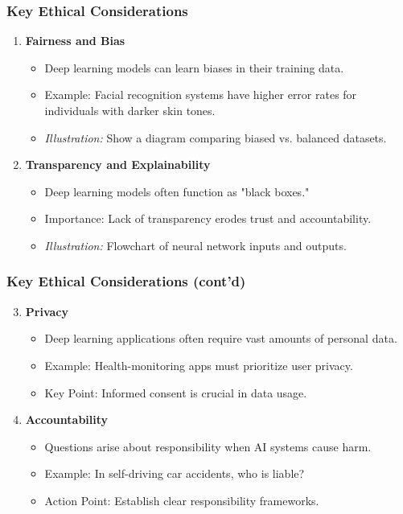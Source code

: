 \documentclass[aspectratio=169]{beamer}
\begin{document}
\begin{frame}[fragile]
    \frametitle{Key Ethical Considerations}
    \begin{enumerate}
        \item \textbf{Fairness and Bias}
        \begin{itemize}
            \item Deep learning models can learn biases in their training data.
            \item Example: Facial recognition systems have higher error rates for individuals with darker skin tones.
            \item \textit{Illustration:} Show a diagram comparing biased vs. balanced datasets.
        \end{itemize}
        
        \item \textbf{Transparency and Explainability}
        \begin{itemize}
            \item Deep learning models often function as "black boxes."
            \item Importance: Lack of transparency erodes trust and accountability.
            \item \textit{Illustration:} Flowchart of neural network inputs and outputs.
        \end{itemize}
    \end{enumerate}
\end{frame}

\begin{frame}[fragile]
    \frametitle{Key Ethical Considerations (cont'd)}
    \begin{enumerate}\setcounter{enumi}{2}
        \item \textbf{Privacy}
        \begin{itemize}
            \item Deep learning applications often require vast amounts of personal data.
            \item Example: Health-monitoring apps must prioritize user privacy.
            \item Key Point: Informed consent is crucial in data usage.
        \end{itemize}

        \item \textbf{Accountability}
        \begin{itemize}
            \item Questions arise about responsibility when AI systems cause harm.
            \item Example: In self-driving car accidents, who is liable?
            \item Action Point: Establish clear responsibility frameworks.
        \end{itemize}
    \end{enumerate}
\end{frame}
\end{document}
